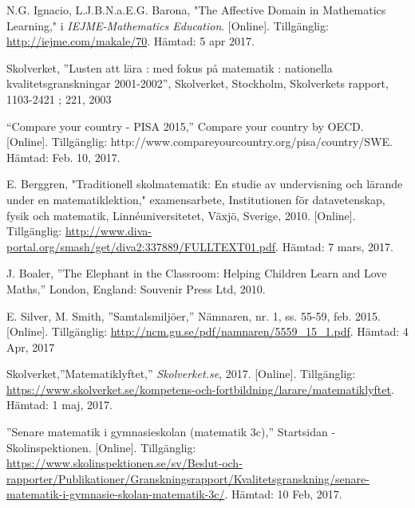     N.G. Ignacio, L.J.B.N.a.E.G. Barona, "The Affective Domain in Mathematics Learning," i \textsl{IEJME-Mathematics Education}. [Online]. Tillgänglig: \url{http://iejme.com/makale/70}. Hämtad: 5 apr 2017.
    
    Skolverket, ''Lusten att l{\"a}ra : med fokus p{\aa} matematik : nationella kvalitetsgranskningar 2001-2002'',  Skolverket, Stockholm, Skolverkets rapport, 1103-2421 ; 221, 2003
    
   
    
    “Compare your country - PISA 2015,” Compare your country by OECD. [Online]. Tillgänglig: http://www.compareyourcountry.org/pisa/country/SWE. Hämtad: Feb. 10, 2017.
    
    E. Berggren, "Traditionell skolmatematik: En studie av undervisning och lärande under en matematiklektion," examensarbete, Institutionen för datavetenskap, fysik och matematik, Linnéuniversitetet, Växjö, Sverige, 2010. [Online]. Tillgänglig: \url{http://www.diva-portal.org/smash/get/diva2:337889/FULLTEXT01.pdf}. Hämtad: 7 mars, 2017.
    
    J. Boaler, ''The Elephant in the Classroom: Helping Children Learn and Love Maths,'' 
    London,
    England: Souvenir Press Ltd, 
    2010. 
    
    E. Silver, M. Smith, ''Samtalsmiljöer,'' Nämnaren, nr. 1, ss. 55-59, feb. 2015. [Online]. Tillgänglig: \url{http://ncm.gu.se/pdf/namnaren/5559_15_1.pdf}. Hämtad: 4 Apr, 2017
    
    Skolverket,''Matematiklyftet,'' \textsl{Skolverket.se}, 2017. [Online]. Tillgänglig: \url{https://www.skolverket.se/kompetens-och-fortbildning/larare/matematiklyftet}. Hämtad: 1 maj, 2017.
    
    ''Senare matematik i gymnasieskolan (matematik 3c),'' Startsidan - Skolinspektionen. [Online]. Tillgänglig: \url{https://www.skolinspektionen.se/sv/Beslut-och-rapporter/Publikationer/Granskningsrapport/Kvalitetsgranskning/senare-matematik-i-gymnasie-skolan-matematik-3c/}. Hämtad: 10 Feb, 2017.
    
